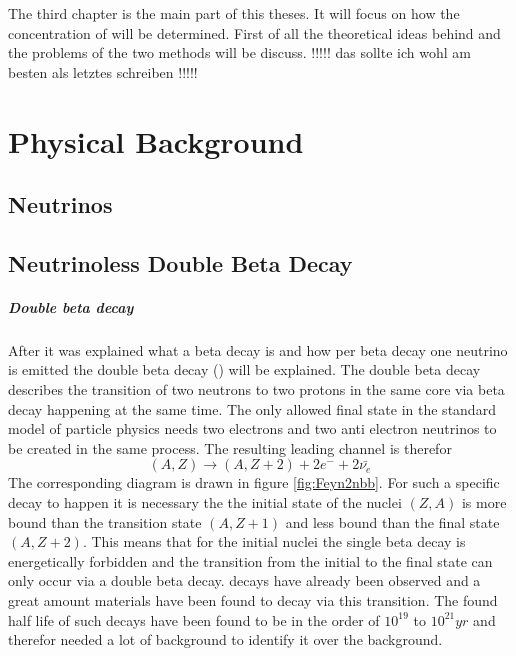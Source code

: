 The third chapter is the main part of this theses. 
It will focus on how the concentration of \Kr will be determined. 
First of all the theoretical ideas behind and the problems of the two methods will be discuss. !!!!! das sollte ich wohl am besten als letztes schreiben !!!!!


\chapter{Physical Background}
\label{sec:PhyBG}

\section{Neutrinos}



\section{Neutrinoless Double Beta Decay}
\label{sec:0nubetabeta}

\paragraph{Double beta decay}

After it was explained what a beta decay is and how per beta decay one neutrino is emitted the double beta decay (\twonu) will be explained.
The double beta decay describes the transition of two neutrons to two protons in the same core via beta decay happening at the same time.
The only allowed final state in the standard model of particle physics needs two electrons and two anti electron neutrinos to be created in the same process.
The resulting leading channel is therefor
\begin{equation}
(A,Z)\rightarrow (A,Z+2) + 2e^- + 2\bar{\nu_e}
\end{equation} 
The corresponding diagram is drawn in figure \ref{fig:Feyn2nbb}.
For such a specific decay to happen it is necessary the the initial state of the nuclei $(Z,A)$ is more bound than the transition state $(A,Z+1)$ and less bound than the final state $(A,Z+2)$.
This means that for the initial nuclei the single beta decay is energetically forbidden and the transition from the initial to the final state can only occur via a double beta decay.
\twonu  decays have already been observed and a great amount materials have been found to decay via this transition.
The found half life of such decays have been found to be in the order of $10^{19}$ to $10^{21} \unit{yr}$ and therefor needed a lot of background to identify it over the background.
\\

